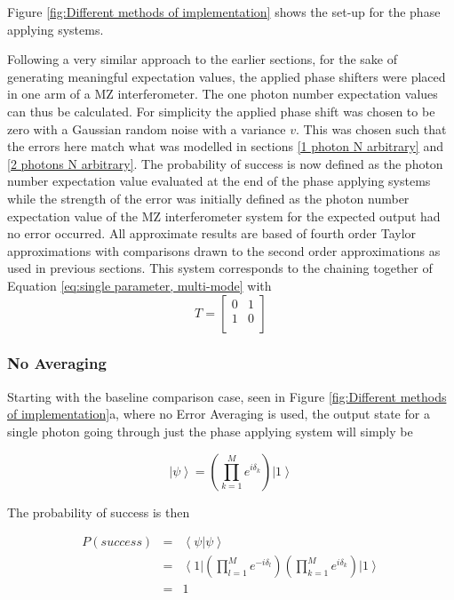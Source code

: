 \documentclass[aps,pra,twocolumn,superscriptaddress,numerical]{revtex4-1}
\begin{document}
		Figure \ref{fig:Different methods of implementation} shows the set-up for the phase applying systems.
		
		Following a very similar approach to the earlier sections, for the sake of generating meaningful expectation values, the applied phase shifters were placed in one arm of a MZ interferometer. The one photon number expectation values can thus be calculated. For simplicity the applied phase shift was chosen to be zero with a Gaussian random noise with a variance $v$. This was chosen such that the errors here match what was modelled in sections \ref{1 photon N arbitrary} and \ref{2 photons N arbitrary}. The probability of success is now defined as the photon number expectation value evaluated at the end of the phase applying systems while the strength of the error was initially defined as the photon number expectation value of the MZ interferometer system for the expected output had no error occurred. All approximate results are based of fourth order Taylor approximations with comparisons drawn to the second order approximations as used in previous sections. This system corresponds to the chaining together of Equation \ref{eq:single parameter, multi-mode} with 
		\begin{equation}
		T=\begin{bmatrix}
			0 & 1 \\
			1 & 0 \\
			\end{bmatrix}
		\end{equation}
			
		
		\subsubsection{No Averaging\label{No Averaging}}
		
		Starting with the baseline comparison case, seen in Figure \ref{fig:Different methods of implementation}a, where no Error Averaging is used, the output state for a single photon going through just the phase applying system will simply be
		
		\begin{equation}
		\left|\psi\right\rangle =\left(\prod_{k=1}^{M}e^{i\delta_{k}}\right)\left|1\right\rangle \label{eq:noAvPhaseState}
		\end{equation}
		
		
		The probability of success is then
		
		\begin{eqnarray}
		P\left(success\right) & = & \left\langle \psi|\psi\right\rangle \nonumber \\
		& = & \left\langle 1\right|\left(\prod_{l=1}^{M}e^{-i\delta_{l}}\right)\left(\prod_{k=1}^{M}e^{i\delta_{k}}\right)\left|1\right\rangle \nonumber \\
		& = & 1\label{eq:noAveProbSuccess}
		\end{eqnarray}
		
\end{document}
